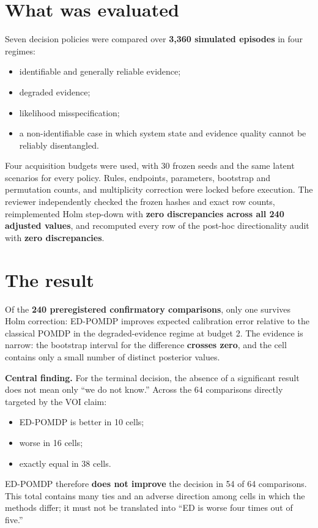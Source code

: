 \documentclass[11pt,a4paper]{article}
\begin{document}
\section*{What was evaluated}

Seven decision policies were compared over \textbf{3,360 simulated episodes} in four regimes:

\begin{itemize}
  \item identifiable and generally reliable evidence;
  \item degraded evidence;
  \item likelihood misspecification;
  \item a non-identifiable case in which system state and evidence quality cannot be reliably disentangled.
\end{itemize}

Four acquisition budgets were used, with 30 frozen seeds and the same latent scenarios for every policy. Rules, endpoints, parameters, bootstrap and permutation counts, and multiplicity correction were locked before execution. The reviewer independently checked the frozen hashes and exact row counts, reimplemented Holm step-down with \textbf{zero discrepancies across all 240 adjusted values}, and recomputed every row of the post-hoc directionality audit with \textbf{zero discrepancies}.

\section*{The result}

Of the \textbf{240 preregistered confirmatory comparisons}, only one survives Holm correction: ED-POMDP improves expected calibration error relative to the classical POMDP in the degraded-evidence regime at budget 2. The evidence is narrow: the bootstrap interval for the difference \textbf{crosses zero}, and the cell contains only a small number of distinct posterior values.

\begin{tcolorbox}[colback=softamber,colframe=orange!70!black,boxrule=0.7pt,arc=2mm]
\textbf{Central finding.} For the terminal decision, the absence of a significant result does not mean only ``we do not know.'' Across the 64 comparisons directly targeted by the VOI claim:
\begin{itemize}
  \item ED-POMDP is better in 10 cells;
  \item worse in 16 cells;
  \item exactly equal in 38 cells.
\end{itemize}
ED-POMDP therefore \textbf{does not improve} the decision in 54 of 64 comparisons. This total contains many ties and an adverse direction among cells in which the methods differ; it must not be translated into ``ED is worse four times out of five.''
\end{tcolorbox}
\end{document}
